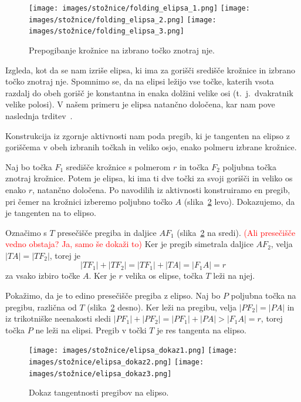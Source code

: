\begin{figure}[h]
    \centering
    \texttt{[image: images/stožnice/folding\_elipsa\_1.png]}
    \texttt{[image: images/stožnice/folding\_elipsa\_2.png]}
    \texttt{[image: images/stožnice/folding\_elipsa\_3.png]}
    \caption[Prepogibanje elipse]{Prepogibanje krožnice na izbrano točko znotraj nje.}
    \label{fig:koraki_elipsa}
\end{figure}


Izgleda, kot da se nam izriše elipsa, ki ima za gorišči središče krožnice in izbrano točko znotraj nje. Spomnimo se, da na elipsi ležijo vse točke, katerih vsota razdalj do obeh gorišč je konstantna in enaka dolžini velike osi (t.\ j.\ dvakratnik velike polosi). V našem primeru je elipsa natančno določena, kar nam pove naslednja trditev~\cite[str.\ 60--61]{hull2013}.

\begin{trditev}
    Konstrukcija iz zgornje aktivnosti nam poda pregib, ki je tangenten na elipso z goriščema v obeh izbranih točkah in veliko osjo, enako polmeru izbrane krožnice.
\end{trditev}

\begin{dokaz}
    Naj bo točka $F_1$ središče krožnice s polmerom $r$ in točka $F_2$ poljubna točka znotraj krožnice. Potem je elipsa, ki ima ti dve točki za svoji gorišči in veliko os enako $r$, natančno določena. Po navodilih iz aktivnosti konstruiramo en pregib, pri čemer na krožnici izberemo poljubno točko $A$ (slika~\ref{fig:dokaz_elipsa} levo). Dokazujemo, da je tangenten na to elipso.

    Označimo s $T$ presečišče pregiba in daljice $AF_1$ (slika~\ref{fig:dokaz_elipsa} na sredi). \textcolor{red}{(Ali presečišče vedno obstaja? Ja, samo še dokaži to)} Ker je pregib simetrala daljice $AF_2$, velja $|TA| = |TF_2|$, torej je
    $$|TF_1| + |TF_2| = |TF_1| + |TA| = |F_1A| = r$$
    za vsako izbiro točke $A$. Ker je $r$ velika os elipse, točka $T$ leži na njej.

    Pokažimo, da je to edino presečišče pregiba z elipso. Naj bo $P$ poljubna točka na pregibu, različna od $T$ (slika~\ref{fig:dokaz_elipsa} desno). Ker leži na pregibu, velja $|PF_2| = |PA|$ in iz trikotniške neenakosti sledi $|PF_1| + |PF_2| = |PF_1| + |PA| > |F_1A| = r$, torej točka $P$ ne leži na elipsi. Pregib v točki $T$ je res tangenta na elipso.

    \begin{figure}[h]
        \centering
        \texttt{[image: images/stožnice/elipsa\_dokaz1.png]}
        \texttt{[image: images/stožnice/elipsa\_dokaz2.png]}
        \texttt{[image: images/stožnice/elipsa\_dokaz3.png]}
        \caption[Tangentnost na elipso]{Dokaz tangentnosti pregibov na elipso.}
        \label{fig:dokaz_elipsa}
    \end{figure}  
\end{dokaz}


